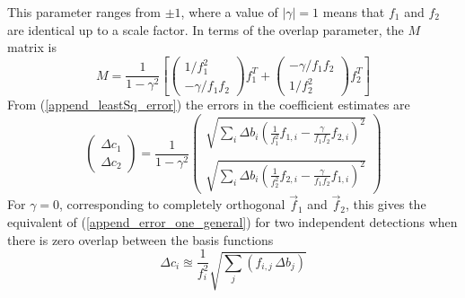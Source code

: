 This parameter ranges from $\pm 1$, where a value of $\left|\gamma\right| = 1$ means that $f_1$ and $f_2$ are identical up to a scale factor. In terms of the overlap parameter, the $M$ matrix is
\begin{equation}
	M = \frac{1}{1 - \gamma^2}
	\left[
	\begin{pmatrix} 1/f_1^2 \\ -\gamma/f_1f_2 \end{pmatrix} f_1^T +
	\begin{pmatrix} -\gamma/f_1f_2 \\ 1/f_2^2 \end{pmatrix} f_2^T
	\right]
\end{equation}
From (\ref{append_leastSq_error}) the errors in the coefficient estimates are
\begin{equation} \label{append_error_two_general}
	\begin{pmatrix}
		\Delta c_1 \\ \Delta c_2
	\end{pmatrix} = 
	\frac{1}{1 - \gamma^2}
	\begin{pmatrix}
		\sqrt{\sum_i \Delta b_i\left( \frac{1}{f_1^2}f_{1,i} - \frac{\gamma}{f_1f_2}f_{2,i} \right)^2} \\ \\
		\sqrt{\sum_i \Delta b_i\left( \frac{1}{f_2^2}f_{2,i} - \frac{\gamma}{f_1f_2}f_{1,i} \right)^2}
	\end{pmatrix}
\end{equation}
For $\gamma = 0$, corresponding to completely orthogonal $\vec{f}_1$ and $\vec{f}_2$, this gives the equivalent of (\ref{append_error_one_general}) for two independent detections when there is zero overlap between the basis functions
\begin{equation}
	\Delta c_{i} \approxeq \frac{1}{f_{i}^2} \sqrt{\sum_j \left(f_{i,j}\, \Delta b_j\right)}
\end{equation}


